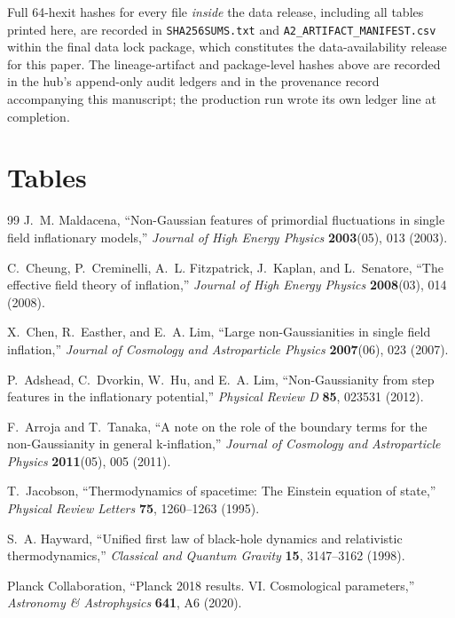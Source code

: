 \documentclass[11pt]{article}
\begin{document}
Full 64-hexit hashes for every file \emph{inside} the data release, including all tables printed
here, are recorded in \texttt{SHA256SUMS.txt} and \texttt{A2\_ARTIFACT\_MANIFEST.csv} within the
final data lock package, which constitutes the data-availability release for this paper. The
lineage-artifact and package-level hashes above are recorded in the hub's append-only audit
ledgers and in the provenance record accompanying this manuscript; the production run wrote its
own ledger line at completion.

\section{Tables}


\clearpage
\begin{landscape}
\footnotesize

\clearpage
\tiny
\setlength{\tabcolsep}{2pt}

\setlength{\tabcolsep}{6pt}
\end{landscape}
\clearpage


\begin{thebibliography}{99}
J.~M. Maldacena,
``Non-Gaussian features of primordial fluctuations in single field inflationary models,''
\emph{Journal of High Energy Physics} \textbf{2003}(05), 013 (2003).

C.~Cheung, P.~Creminelli, A.~L. Fitzpatrick, J.~Kaplan, and L.~Senatore,
``The effective field theory of inflation,''
\emph{Journal of High Energy Physics} \textbf{2008}(03), 014 (2008).

X.~Chen, R.~Easther, and E.~A. Lim,
``Large non-Gaussianities in single field inflation,''
\emph{Journal of Cosmology and Astroparticle Physics} \textbf{2007}(06), 023 (2007).

P.~Adshead, C.~Dvorkin, W.~Hu, and E.~A. Lim,
``Non-Gaussianity from step features in the inflationary potential,''
\emph{Physical Review D} \textbf{85}, 023531 (2012).

F.~Arroja and T.~Tanaka,
``A note on the role of the boundary terms for the non-Gaussianity in general k-inflation,''
\emph{Journal of Cosmology and Astroparticle Physics} \textbf{2011}(05), 005 (2011).

T.~Jacobson,
``Thermodynamics of spacetime: The Einstein equation of state,''
\emph{Physical Review Letters} \textbf{75}, 1260--1263 (1995).

S.~A. Hayward,
``Unified first law of black-hole dynamics and relativistic thermodynamics,''
\emph{Classical and Quantum Gravity} \textbf{15}, 3147--3162 (1998).

Planck Collaboration,
``Planck 2018 results. VI. Cosmological parameters,''
\emph{Astronomy \& Astrophysics} \textbf{641}, A6 (2020).

\end{thebibliography}
\end{document}
